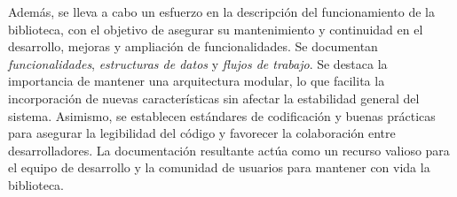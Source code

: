 Además, se lleva a cabo un esfuerzo en la descripción del funcionamiento de la biblioteca, con el objetivo 
de asegurar su mantenimiento y continuidad en el desarrollo, mejoras y ampliación de funcionalidades. Se 
documentan \textit{funcionalidades}, \textit{estructuras de datos} y \textit{flujos de trabajo}. Se destaca 
la importancia de mantener una arquitectura modular, lo que facilita la incorporación 
de nuevas características sin afectar la estabilidad general del sistema. Asimismo, se establecen estándares 
de codificación y buenas prácticas para asegurar la legibilidad del código y favorecer la colaboración entre 
desarrolladores. La documentación resultante actúa como un recurso valioso para el equipo de desarrollo y 
la comunidad de usuarios para mantener con vida la biblioteca.







